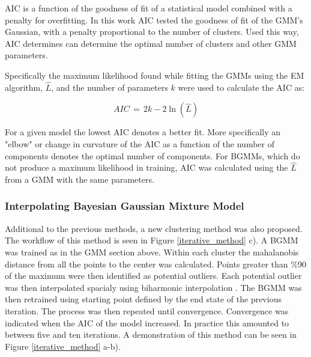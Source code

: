 \documentclass[a4paper,11pt]{article}
\begin{document}
AIC is a function of the goodness of fit of a statistical model combined with a penalty for overfitting. In this work AIC tested the goodness of fit of the GMM's Gaussian, with a penalty proportional to the number of clusters. Used this way, AIC determines can determine the optimal number of clusters and other GMM parameters.

Specifically the maximum likelihood found while fitting the GMMs using the EM algorithm, $\hat L$, and the number of parameters $k$ were used to calculate the AIC as:

\begin{equation}
    AIC \, = \, 2k - 2\ln(\hat L)
\end{equation}

For a given model the lowest AIC denotes a better fit. More specifically an "elbow" or change in curvature of the AIC as a function of the number of components denotes the optimal number of components. For BGMMs, which do not produce a maximum likelihood in training, AIC was calculated using the $\hat L$ from a GMM with the same parameters.

\subsubsection{Interpolating Bayesian Gaussian Mixture Model}

Additional to the previous methods, a new clustering method was also proposed. The workflow of this method is seen in Figure \ref{iterative_method} c). A BGMM was trained as in the GMM section above. Within each cluster the mahalanobis distance \cite{Mahalanobis1936OnStatistics} from all the points to the center was calculated. Points greater than \%90 of the maximum were then identified as potential outliers. Each potential outlier was then interpolated spacialy using biharmonic interpolation \cite{Damelin2017OnAspects}. The BGMM was then retrained using starting point defined by the end state of the previous iteration. The process was then repeated until convergence. Convergence was indicated when the AIC of the model increased. In practice this amounted to between five and ten iterations. A demonstration of this method can be seen in Figure \ref{iterative_method} a-b).
\end{document}
